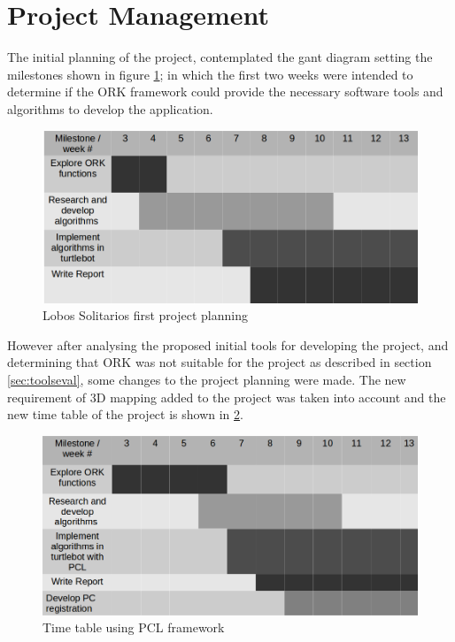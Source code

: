 \documentclass[fontsize=12pt]{article}
\begin{document}
\section{Project Management}
\label{sec:planning}
The initial planning of the project, contemplated  the gant diagram setting the milestones shown in figure \ref{fig:plan1}; in which the first two weeks were intended to determine if the ORK framework could provide the necessary software tools and algorithms to develop the application.
\begin{figure}[H]
\begin{center}
\includegraphics[width=0.8\linewidth]{images/plan1}
\caption{Lobos Solitarios first project planning}
\label{fig:plan1}
\end{center}
\end{figure}

However after analysing the proposed initial tools for developing the project, and determining that ORK was not suitable for the project as described in section \ref{sec:toolseval}, some changes to the project planning were made. The new requirement of 3D mapping added to the project was taken into account and the new time table of the project is shown in \ref{fig:plan2}.
\begin{figure}[H]
\begin{center}
\includegraphics[width=0.7\linewidth]{images/plan2}
\caption{Time table using PCL framework}
\label{fig:plan2}
\end{center}
\end{figure}
\end{document}
